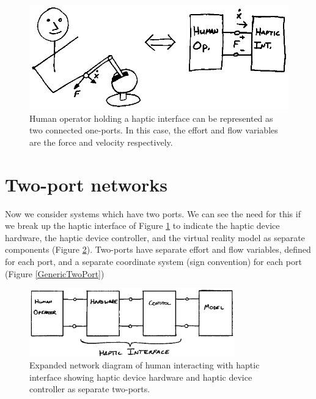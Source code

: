 \begin{figure}[p]	%
\centering \includegraphics{figs14/00305.eps}	%
\caption{Human operator holding a haptic interface can be represented as two connected one-ports. In this case, the effort and flow variables are the force and velocity respectively.}\label{ConnectedOnePorts}	%
\end{figure}	%





\section{Two-port networks}
Now we consider systems which have two ports.  We can see the need for this if we break up the haptic interface of Figure \ref{ConnectedOnePorts} to indicate the haptic device hardware, the haptic device controller, and the virtual reality model as separate components (Figure \ref{HumanHapticInterface2Ports}).  Two-ports have separate effort and flow variables, defined for each port, and a separate coordinate system (sign convention) for each port (Figure \ref{GenericTwoPort})

\begin{figure}[p]	%
\centering \includegraphics[width=3.5in]{figs14/00306.eps}
\caption{Expanded network diagram of human interacting with haptic interface showing haptic device hardware and haptic device controller as separate two-ports.}\label{HumanHapticInterface2Ports}	%
\end{figure}	%




